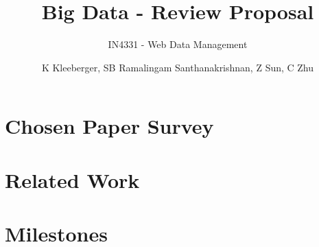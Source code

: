\documentclass[sigconf]{acmart}
\title{Big Data - Review Proposal}
\subtitle{IN4331 - Web Data Management}
\author{K Kleeberger, SB Ramalingam Santhanakrishnan, Z Sun, C Zhu}
\affiliation{TU Delft - Student Numbers (, 4740270, ,)}
\begin{document}

\maketitle

\section{Chosen Paper Survey}

\section{Related Work}
\label{sec:related_work}

\section{Milestones}
\label{sec:milestones}




\end{document}
